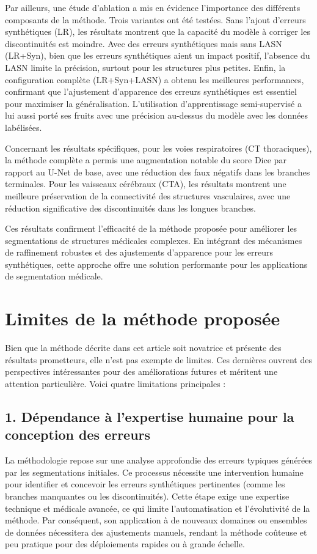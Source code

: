 \documentclass[a4paper,12pt]{article}
\begin{document}
\begin{multicols}{2}
Par ailleurs, une étude d’ablation a mis en évidence l’importance des différents composants
de la méthode. Trois variantes ont été testées. Sans l’ajout d’erreurs synthétiques (LR), les
résultats montrent que la capacité du modèle à corriger les discontinuités est moindre. Avec
des erreurs synthétiques mais sans LASN (LR+Syn), bien que les erreurs synthétiques aient un
impact positif, l’absence du LASN limite la précision, surtout pour les structures plus petites.
Enfin, la configuration complète (LR+Syn+LASN) a obtenu les meilleures performances, confirmant que l’ajustement d’apparence des erreurs synthétiques est essentiel pour maximiser la
généralisation. L’utilisation d’apprentissage semi-supervisé a lui aussi porté ses fruits avec une
précision au-dessus du modèle avec les données labélisées.

Concernant les résultats spécifiques, pour les voies respiratoires (CT thoraciques), la méthode
complète a permis une augmentation notable du score Dice par rapport au U-Net de base, avec
une réduction des faux négatifs dans les branches terminales. Pour les vaisseaux cérébraux (CTA),
les résultats montrent une meilleure préservation de la connectivité des structures vasculaires,
avec une réduction significative des discontinuités dans les longues branches.

Ces résultats confirment l’efficacité de la méthode proposée pour améliorer les segmentations
de structures médicales complexes. En intégrant des mécanismes de raffinement robustes et
des ajustements d’apparence pour les erreurs synthétiques, cette approche offre une solution
performante pour les applications de segmentation médicale.


\section*{Limites de la méthode proposée}

Bien que la méthode décrite dans cet article soit novatrice et présente des résultats prometteurs, elle n’est pas exempte de limites. Ces dernières ouvrent des perspectives intéressantes pour des améliorations futures et méritent une attention particulière. Voici quatre limitations principales :

\subsection*{1. Dépendance à l’expertise humaine pour la conception des erreurs}
La méthodologie repose sur une analyse approfondie des erreurs typiques générées par les segmentations initiales. Ce processus nécessite une intervention humaine pour identifier et concevoir les erreurs synthétiques pertinentes (comme les branches manquantes ou les discontinuités). Cette étape exige une expertise technique et médicale avancée, ce qui limite l’automatisation et l’évolutivité de la méthode. Par conséquent, son application à de nouveaux domaines ou ensembles de données nécessitera des ajustements manuels, rendant la méthode coûteuse et peu pratique pour des déploiements rapides ou à grande échelle.


\end{multicols}
\end{document}
